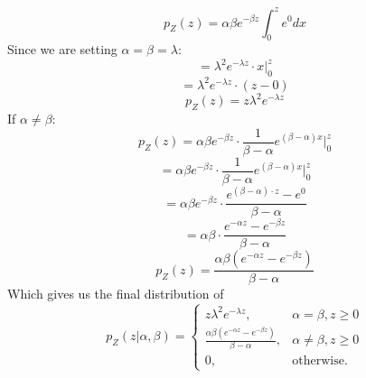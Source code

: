 \documentclass{article}
\begin{document}
{\[
  p_Z(z) = \alpha \beta e^{-\beta z} \int_{0}^{z} e^{0} dx
\]
Since we are setting \(\alpha = \beta = \lambda\):
\[
  = \lambda^2 e^{-\lambda z} \cdot x |_{0}^{z}
\]
\[
  = \lambda^2 e^{-\lambda z} \cdot (z - 0)
\]
\[
  p_Z(z) = z\lambda^2e^{-\lambda z}
\]
If \(\alpha \neq \beta\): \\
\[
  p_Z(z) = \alpha \beta e^{-\beta z} \cdot \frac{1}{\beta - \alpha} e^{(\beta - \alpha) x}  |_{0}^{z}
\]
\[
  = \alpha \beta e^{-\beta z} \cdot \frac{1}{\beta - \alpha} e^{(\beta - \alpha) x} |_{0}^{z}
\]
\[
  = \alpha \beta e^{-\beta z} \cdot \frac{e^{(\beta - \alpha) \cdot z} - e^0}{\beta - \alpha}
\]
\[
  = \alpha \beta \cdot \frac{e^{- \alpha z} - e^{- \beta z}}{\beta - \alpha}
\]
\[
  p_Z(z) = \frac{\alpha \beta (e^{- \alpha z} - e^{- \beta z})}{\beta - \alpha}
\]
Which gives us the final distribution of 
\[
  \boxed{
  p_Z(z | \alpha, \beta) = 
  \begin{cases}
    z\lambda^2e^{-\lambda z}, & \alpha = \beta, z \geq 0 \\
    \frac{\alpha \beta (e^{- \alpha z} - e^{- \beta z})}{\beta - \alpha}, & \alpha \neq \beta, z \geq 0 \\
    0, & \text{otherwise.}
  \end{cases}
  }
\]

}
\end{document}
